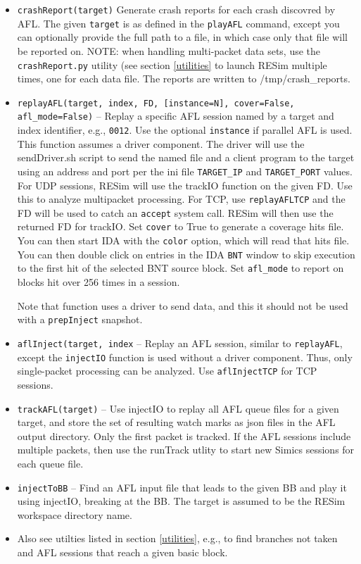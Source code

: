 \documentclass[titlepage]{article}
\begin{document}
\begin{itemize}
\item{\tt crashReport(target)} Generate crash reports for each crash discovred by AFL.  The given {\tt target} is as defined in the {\tt playAFL} command, except you can optionally provide the
full path to a file, in which case only that file will be reported on.  NOTE: when handling multi-packet data sets, use the {\tt crashReport.py} utility (see section \ref{utilities} to launch RESim multiple times,
one for each data file.  The reports are written to /tmp/crash\_reports.

\item{\tt replayAFL(target, index, FD, [instance=N], cover=False, afl\_mode=False)} -- Replay a specific AFL session named by a target and index identifier, e.g., {\tt 0012}.  Use the optional {\tt instance} if parallel AFL is used.  This function assumes a driver component. The driver will use the sendDriver.sh script to send the named file and
a client program to the target using an address and port per the ini file {\tt TARGET\_IP} and {\tt TARGET\_PORT} values.  For UDP sessions, RESim will use the trackIO function on the given FD.  Use this to analyze multipacket processing.  For TCP, use {\tt replayAFLTCP} and the FD will be used to catch an {\tt accept} system call.  RESim will then use the returned FD for trackIO.  Set {\tt cover} to True to generate a coverage hits file.  You can then start IDA with the {\tt color} option, which
will read that hits file.   You can then double click on entries in the IDA {\tt BNT} window to skip execution to the first hit of the selected BNT source block.
Set {\tt afl\_mode} to report on blocks hit over 256 times in a session.

Note that function uses a driver to send data, and this it should not be used with a {\tt prepInject} snapshot.

\item{\tt aflInject(target, index} -- Replay an AFL session, similar to {\tt replayAFL}, except the {\tt injectIO} function is used without
a driver component.  Thus, only single-packet processing can be analyzed.  Use {\tt aflInjectTCP} for TCP sessions.

\item{\tt trackAFL(target)} -- Use injectIO to replay all AFL queue files for a given target, and store the set of resulting watch marks as json files
in the AFL output directory.  Only the first packet is tracked.  If the AFL sessions include multiple packets, then use the runTrack utlity to 
start new Simics sessions for each queue file.

\item{\tt injectToBB} -- Find an AFL input file that leads to the given BB and play it using injectIO, breaking at the BB.  The target
is assumed to be the RESim workspace directory name.


\item Also see utilties listed in section \ref{utilities}, e.g., to find branches not taken and AFL sessions that reach a given basic block.

\end{itemize}
\end{document}

